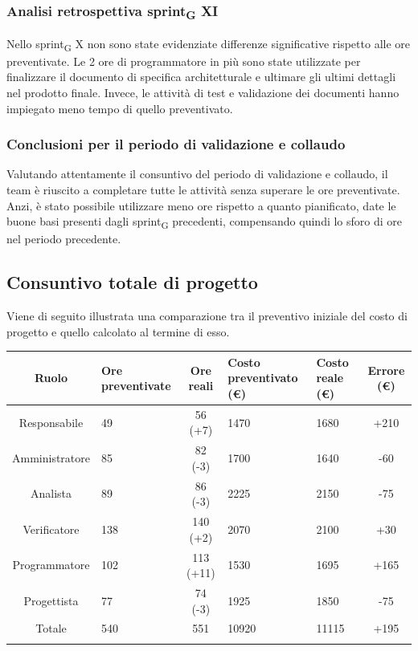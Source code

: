 \subsubsection{Analisi retrospettiva sprint\textsubscript{G} XI}

Nello sprint\textsubscript{G} X non sono state evidenziate differenze significative rispetto alle ore preventivate.
Le 2 ore di programmatore in più sono state utilizzate per finalizzare il documento di specifica architetturale e ultimare gli ultimi dettagli nel prodotto finale.
Invece, le attività di test e validazione dei documenti hanno impiegato meno tempo di quello preventivato.

\subsubsection{Conclusioni per il periodo di validazione e collaudo}

Valutando attentamente il consuntivo del periodo di validazione e collaudo, il team è riuscito a completare tutte le attività senza superare le ore preventivate. 
Anzi, è stato possibile utilizzare meno ore rispetto a quanto pianificato, date le buone basi presenti dagli sprint\textsubscript{G} precedenti, compensando quindi lo sforo di ore nel periodo precedente.




\newpage

\subsection{Consuntivo totale di progetto}
Viene di seguito illustrata una comparazione tra il preventivo iniziale del costo di progetto e quello calcolato al termine di esso.
\setlength\extrarowheight{5pt}
\begin{tabularx}{\textwidth}{|c|XcXX|c|}
	\hline
	\rowcolor{white}
	\textbf{Ruolo} & \textbf{Ore preventivate} & \textbf{Ore reali} & \textbf{Costo preventivato (€)} & \textbf{Costo reale (€)} & \textbf{Errore (€)} \\
	\hline
	Responsabile &49& 56 (+7) &1470&1680& +210 \\ 
	Amministratore &85& 82 (-3) &1700&1640& -60\\
	Analista &89&86 (-3)&2225&2150& -75 \\
	Verificatore &138&140 (+2)&2070&2100& +30 \\
	Programmatore &102&113 (+11)&1530&1695& +165 \\
	Progettista &77&74 (-3)&1925&1850& -75 \\
	\hline
	Totale &540&551&10920&11115&+195\\
	\hline
	\rowcolor{white}
	\caption{Consuntivo totale di ore e costi per ruolo}
\end{tabularx}


